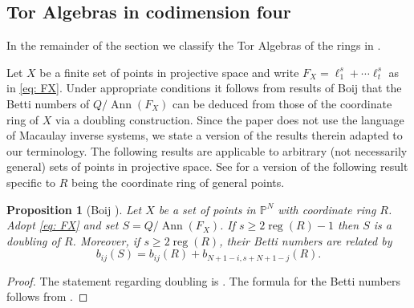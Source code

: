 \documentclass[reqno]{amsart}
\DeclareMathOperator{\Ann}{Ann}
\DeclareMathOperator{\reg}{reg}
\renewcommand{\P}{\mathbb{P}}
\theoremstyle{plain} %
\newtheorem{prop}[theorem]{Proposition}
\theoremstyle{definition}
\theoremstyle{remark}
\begin{document}
\subsection{Tor Algebras in codimension four}


In the remainder of the section we classify the Tor Algebras of the rings in . 

Let $X$ be a finite set of points in projective space and write $F_X=\ell_1^{s}+\cdots \ell_t^{s}$ as in \eqref{eq: FX}. Under appropriate conditions it follows from results of Boij \cite{Boij} that the Betti numbers of $Q/\Ann(F_X)$ can be deduced from those of the coordinate ring of $X$ via a doubling construction.  Since the paper \cite{Boij} does not use the language of Macaulay inverse systems, we state a version of the results therein adapted to our terminology. The following results are applicable to arbitrary (not necessarily general) sets of points in projective space. See \cite[Theorem 4.8]{AG-WaringRk}  for a version of the following result specific to $R$ being the coordinate ring of general points.


\begin{prop}[Boij \cite{Boij}] \label{isDoubling}  
Let $X$ be a set of points in $\P^{N}$ with coordinate ring $R$. Adopt \eqref{eq: FX} and set $S=Q/\Ann(F_X)$. If $s\geq 2\reg(R)-1$ then $S$ is a doubling of $R$. Moreover, if $s\geq 2\reg(R)$, their Betti numbers are related by $$b_{ij}(S)=b_{ij}(R)+b_{N+1-i,s+N+1-j}(R).$$

\end{prop}
\begin{proof} 

 The statement regarding doubling is \cite[Theorem 3.4]{Boij}. The formula for the Betti numbers follows from \cite[Proposition 3.5]{Boij}. 
\end{proof}
\end{document}
